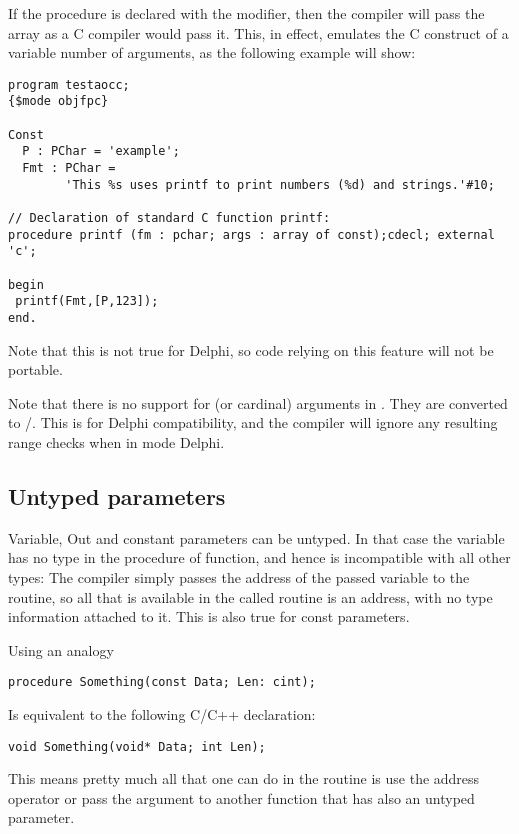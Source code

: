 If the procedure is declared with the  modifier, then the
compiler will pass the array as a C compiler would pass it. This, in effect,
emulates the C construct of a variable number of arguments, as the following
example will show:
\begin{verbatim}
program testaocc;
{$mode objfpc}

Const
  P : PChar = 'example';
  Fmt : PChar =
        'This %s uses printf to print numbers (%d) and strings.'#10;

// Declaration of standard C function printf:
procedure printf (fm : pchar; args : array of const);cdecl; external 'c';

begin
 printf(Fmt,[P,123]);
end.
\end{verbatim}
\begin{remark}
Note that this is not true for Delphi, so code relying on this feature
will not be portable.
\end{remark}

\begin{remark}
Note that there is no support for  (or cardinal) arguments in .
They are converted to /.
This is for Delphi compatibility, and the compiler will ignore any resulting range checks
when in mode Delphi.
\end{remark}

\subsection{Untyped parameters}
Variable, Out and constant parameters can be untyped. In that case the variable has no type
in the procedure of function, and hence is incompatible with all other
types: The compiler simply passes the address of the passed variable to the
routine, so all that is available in the called routine is an address, with
no type information attached to it. This is also true for const parameters. 

Using an analogy
\begin{verbatim}
procedure Something(const Data; Len: cint);
\end{verbatim}
Is equivalent to the following C/C++ declaration:
\begin{verbatim}
void Something(void* Data; int Len);
\end{verbatim}
This means pretty much all that one can do in the routine is use the address operator
or pass the argument to another function that has also an untyped parameter. 

